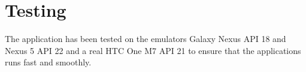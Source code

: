 \section{Testing}
The application has been tested on the emulators Galaxy Nexus API 18 and Nexus 5 API 22 and a real HTC One M7 API 21 to ensure that the applications runs fast and smoothly.